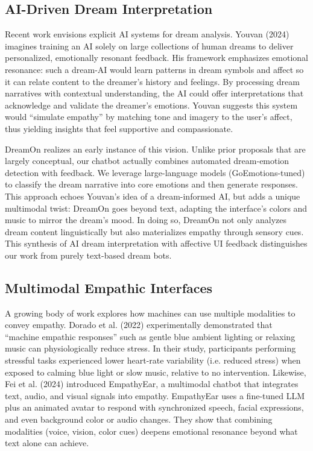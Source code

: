 \documentclass[conference]{IEEEtran}
\begin{document}
    \subsection{AI-Driven Dream Interpretation}
    Recent work envisions explicit AI systems for dream analysis. Youvan (2024) imagines training an AI solely on large collections of human dreams to deliver personalized, emotionally resonant feedback. His framework emphasizes emotional resonance: such a dream-AI would learn patterns in dream symbols and affect so it can relate content to the dreamer’s history and feelings. By processing dream narratives with contextual understanding, the AI could offer interpretations that acknowledge and validate the dreamer’s emotions. Youvan suggests this system would “simulate empathy” by matching tone and imagery to the user’s affect, thus yielding insights that feel supportive and compassionate.

    DreamOn realizes an early instance of this vision. Unlike prior proposals that are largely conceptual, our chatbot actually combines automated dream-emotion detection with feedback. We leverage large-language models (GoEmotions-tuned) to classify the dream narrative into core emotions and then generate responses. This approach echoes Youvan’s idea of a dream-informed AI, but adds a unique multimodal twist: DreamOn goes beyond text, adapting the interface’s colors and music to mirror the dream’s mood. In doing so, DreamOn not only analyzes dream content linguistically but also materializes empathy through sensory cues. This synthesis of AI dream interpretation with affective UI feedback distinguishes our work from purely text-based dream bots.

    \subsection{Multimodal Empathic Interfaces}
    A growing body of work explores how machines can use multiple modalities to convey empathy. Dorado et al. (2022) experimentally demonstrated that “machine empathic responses” such as gentle blue ambient lighting or relaxing music can physiologically reduce stress. In their study, participants performing stressful tasks experienced lower heart-rate variability (i.e. reduced stress) when exposed to calming blue light or slow music, relative to no intervention. Likewise, Fei et al. (2024) introduced EmpathyEar, a multimodal chatbot that integrates text, audio, and visual signals into empathy. EmpathyEar uses a fine-tuned LLM plus an animated avatar to respond with synchronized speech, facial expressions, and even background color or audio changes. They show that combining modalities (voice, vision, color cues) deepens emotional resonance beyond what text alone can achieve. 
    
\end{document}
